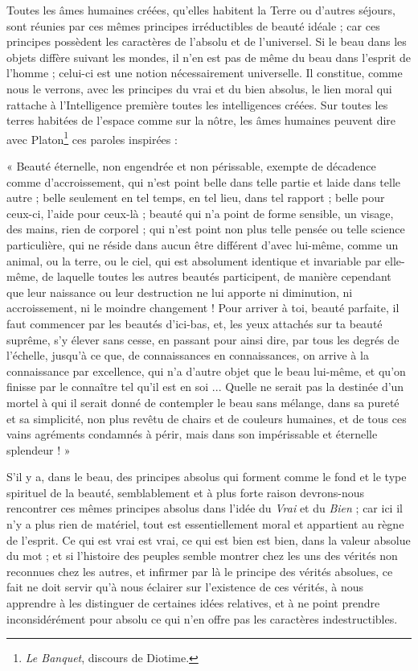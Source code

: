 \documentclass[a4paper, 11pt, oneside]{article}
\begin{document}
Toutes les âmes humaines créées, qu'elles habitent la Terre ou d'autres séjours, sont réunies par ces mêmes principes irréductibles de beauté idéale ; car ces principes possèdent les caractères de l'absolu et de l'universel. Si le beau dans les objets diffère suivant les mondes, il n'en est pas de même du beau dans l'esprit de l'homme ; celui-ci est une notion nécessairement universelle. Il constitue, comme nous le verrons, avec les principes du vrai et du bien absolus, le lien moral qui rattache à l'Intelligence première toutes les intelligences créées. Sur toutes les terres habitées de l'espace comme sur la nôtre, les âmes humaines peuvent dire avec Platon\footnote{\emph{Le Banquet}, discours de Diotime.} ces paroles inspirées :

« Beauté éternelle, non engendrée et non périssable, exempte de décadence comme d'accroissement, qui n'est point belle dans telle partie et laide dans telle autre ; belle seulement en tel temps, en tel lieu, dans tel rapport ; belle pour ceux-ci, l'aide pour ceux-là ; beauté qui n'a point de forme sensible, un visage, des mains, rien de corporel ; qui n'est point non plus telle pensée ou telle science particulière, qui ne réside dans aucun être différent d'avec lui-même, comme un animal, ou la terre, ou le ciel, qui est absolument identique et invariable par elle-même, de laquelle toutes les autres beautés participent, de manière cependant que leur naissance ou leur destruction ne lui apporte ni diminution, ni accroissement, ni le moindre changement ! Pour arriver à toi, beauté parfaite, il faut commencer par les beautés d'ici-bas, et, les yeux attachés sur ta beauté suprême, s'y élever sans cesse, en passant pour ainsi dire, par tous les degrés de l'échelle, jusqu'à ce que, de connaissances en connaissances, on arrive à la connaissance par excellence, qui n'a d'autre objet que le beau lui-même, et qu'on finisse par le connaître tel qu'il est en soi ... Quelle ne serait pas la destinée d'un mortel à qui il serait donné de contempler le beau sans mélange, dans sa pureté et sa simplicité, non plus revêtu de chairs et de couleurs humaines, et de tous ces vains agréments condamnés à périr, mais dans son impérissable et éternelle splendeur ! »

S'il y a, dans le beau, des principes absolus qui forment comme le fond et le type spirituel de la beauté, semblablement et à plus forte raison devrons-nous rencontrer ces mêmes principes absolus dans l'idée du \emph{Vrai} et du \emph{Bien} ; car ici il n'y a plus rien de matériel, tout est essentiellement moral et appartient au règne de l'esprit. Ce qui est vrai est vrai, ce qui est bien est bien, dans la valeur absolue du mot ; et si l'histoire des peuples semble montrer chez les uns des vérités non reconnues chez les autres, et infirmer par là le principe des vérités absolues, ce fait ne doit servir qu'à nous éclairer sur l'existence de ces vérités, à nous apprendre à les distinguer de certaines idées relatives, et à ne point prendre inconsidérément pour absolu ce qui n'en offre pas les caractères indestructibles.
\end{document}
